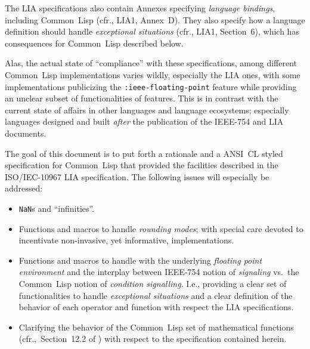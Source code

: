\documentclass[10pt,fleqn]{article}
\newcommand{\CL}{\textsf{Common~Lisp}}
\newcommand{\marginnote}[1]{%
\marginpar{\begin{small}\begin{em}
{\raggedright #1}
\end{em}\end{small}}}
\newcommand{\code}[1]{\texttt{#1}}
\newcommand{\clterm}[1]{\textit{#1}}
\newcommand{\IEEEFPStd}{IEEE-754}
\newcommand{\IECLIA}{ISO/IEC-10967}
\newcommand{\ANSICL}{\textsf{ANSI~CL}}
\begin{document}
\vspace*{3mm}

\noindent
The LIA specifications also contain Annexes specifying \emph{language
  bindings}, including \CL{} (cfr., LIA1, Annex~D).  They also specify
how a language definition should handle \emph{exceptional situations}
(cfr., LIA1, Section~6), which has consequences for \CL{} described
below.

\vspace*{3mm}

\noindent
Alas, the actual state of ``compliance'' with these specifications,
among different \CL{} implementations varies wildly, especially the
LIA ones, with some implementations publicizing the
\code{:ieee-floating-point} feature while providing an unclear subset
of functionalities of features.
This is in contrast with the current state of affairs in other
languages and language ecosystems; especially languages designed and
built \emph{after} the publication of the \IEEEFPStd{} and LIA
documents.

\vspace*{3mm}


The goal of this document is to put forth a rationale and a \ANSICL{}
styled specification for \CL{} that provided the facilities described
in the \IECLIA{} LIA specification.
%
The following issues will especially 
be addressed:
\begin{itemize}
\item \code{NaN}s and ``infinities''.

\item Functions and macros to handle \emph{rounding modes}; with
  special care devoted to incentivate non-invasive, yet informative,
  implementations.

\item Functions and macros to handle with the underlying
  \emph{floating point environment} and the interplay between
  \IEEEFPStd{} notion of \emph{signaling} vs.~the \CL{} notion of
  \clterm{condition signalling}.  I.e., providing a clear set of
  functionalities to handle \emph{exceptional situations} and a clear
  definition of the behavior of each operator and function with
  respect the LIA specifications.
  
\item Clarifying the behavior of the \CL{} set of mathematical
  functions (cfr.,~Section~12.2 of \cite{1996:ANSIHyperSpec}) with respect
  to the specification contained herein.
\end{itemize}
\end{document}
